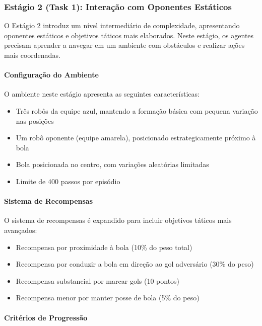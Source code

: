 \subsubsection{Estágio 2 (Task 1): Interação com Oponentes Estáticos}
\label{subsubsec:estagio2}

O Estágio 2 introduz um nível intermediário de complexidade, apresentando oponentes estáticos e objetivos táticos mais elaborados. Neste estágio, os agentes precisam aprender a navegar em um ambiente com obstáculos e realizar ações mais coordenadas.

\paragraph{Configuração do Ambiente}

O ambiente neste estágio apresenta as seguintes características:
\begin{itemize}
    \item Três robôs da equipe azul, mantendo a formação básica com pequena variação nas posições
    \item Um robô oponente (equipe amarela), posicionado estrategicamente próximo à bola
    \item Bola posicionada no centro, com variações aleatórias limitadas
    \item Limite de 400 passos por episódio
\end{itemize}

\paragraph{Sistema de Recompensas}

O sistema de recompensas é expandido para incluir objetivos táticos mais avançados:
\begin{itemize}
    \item Recompensa por proximidade à bola (10\% do peso total)
    \item Recompensa por conduzir a bola em direção ao gol adversário (30\% do peso)
    \item Recompensa substancial por marcar gols (10 pontos)
    \item Recompensa menor por manter posse de bola (5\% do peso)
\end{itemize}

\paragraph{Critérios de Progressão}

